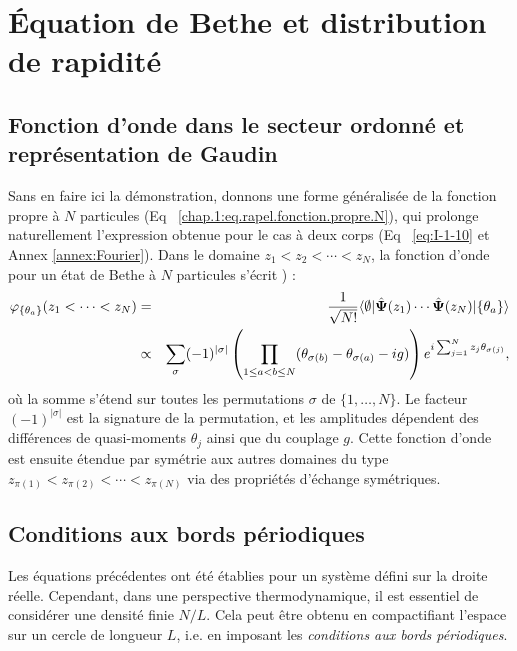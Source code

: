 \section{Équation de Bethe et distribution de rapidité}

\subsection{Fonction d’onde dans le secteur ordonné et représentation de Gaudin}

Sans en faire ici la démonstration, donnons une forme généralisée de la fonction propre à $N$ particules (Eq~ \eqref{chap.1:eq.rapel.fonction.propre.N}), qui prolonge naturellement l’expression obtenue pour le cas à deux corps (Eq~ \eqref{eq:I-1-10} et Annex \ref{annex:Fourier}).
Dans le domaine $z_1 < z_2 < \cdots < z_N$, la fonction d’onde pour un état de Bethe à $N$ particules s’écrit  \cite{Korepin_1997,Gaudin_2014,LL_1963_1,Franchini_2016,Wouters2015}) :
\begin{eqnarray}
	\varphi_{\{\theta_a\}} ( z_1 < \cdots < z_N ) & = &  \frac{1}{\sqrt{N!}}\langle \emptyset \vert \hat{\bm{\Psi}} ( z_1 ) \cdots \hat{\bm{\Psi}} (z_N ) \vert \{ \theta_a \} \rangle \notag\\
	& \propto & \sum_\sigma (-1)^{|\sigma|} \left( \prod_{1 \leq a < b \leq N} (\theta_{\sigma(b)} - \theta_{\sigma(a)} - i g) \right) e^{i \sum_{j=1}^{N} z_j \theta_{\sigma(j)}},\label{eq:I-2-17}
\end{eqnarray}
où la somme s'étend sur toutes les permutations $\sigma$ de $\{1,\dots,N\}$. Le facteur $(-1)^{|\sigma|}$ est la signature de la permutation, et les amplitudes dépendent des différences de quasi-moments $\theta_j$ ainsi que du couplage $g$.
Cette fonction d’onde est ensuite étendue par symétrie aux autres domaines du type $z_{\pi(1)} < z_{\pi(2)} < \cdots < z_{\pi(N)}$ via des propriétés d’échange symétriques.

\vspace{1em}

\subsection{Conditions aux bords périodiques}

Les équations précédentes ont été établies pour un système défini sur la droite réelle. Cependant, dans une perspective thermodynamique, il est essentiel de considérer une densité finie $ N/L$. Cela peut être obtenu en compactifiant l’espace sur un cercle de longueur $L$, i.e. en imposant les {\em conditions aux bords périodiques}.

